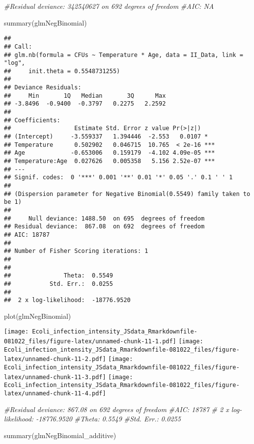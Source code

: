\documentclass[
]{article}
\newenvironment{Shaded}{\begin{snugshade}}{\end{snugshade}}
\newcommand{\CommentTok}[1]{\textcolor[rgb]{0.56,0.35,0.01}{\textit{#1}}}
\newcommand{\FunctionTok}[1]{\textcolor[rgb]{0.00,0.00,0.00}{#1}}
\newcommand{\NormalTok}[1]{#1}
\begin{document}
\begin{Shaded}
\begin{Highlighting}[]
\CommentTok{\#Residual deviance: 342540627  on 692  degrees of freedom}
\CommentTok{\#AIC: NA}

\FunctionTok{summary}\NormalTok{(glmNegBinomial)}
\end{Highlighting}
\end{Shaded}

\begin{verbatim}
## 
## Call:
## glm.nb(formula = CFUs ~ Temperature * Age, data = II_Data, link = "log", 
##     init.theta = 0.5548731255)
## 
## Deviance Residuals: 
##     Min       1Q   Median       3Q      Max  
## -3.8496  -0.9400  -0.3797   0.2275   2.2592  
## 
## Coefficients:
##                  Estimate Std. Error z value Pr(>|z|)    
## (Intercept)     -3.559337   1.394446  -2.553   0.0107 *  
## Temperature      0.502902   0.046715  10.765  < 2e-16 ***
## Age             -0.653006   0.159179  -4.102 4.09e-05 ***
## Temperature:Age  0.027626   0.005358   5.156 2.52e-07 ***
## ---
## Signif. codes:  0 '***' 0.001 '**' 0.01 '*' 0.05 '.' 0.1 ' ' 1
## 
## (Dispersion parameter for Negative Binomial(0.5549) family taken to be 1)
## 
##     Null deviance: 1488.50  on 695  degrees of freedom
## Residual deviance:  867.08  on 692  degrees of freedom
## AIC: 18787
## 
## Number of Fisher Scoring iterations: 1
## 
## 
##               Theta:  0.5549 
##           Std. Err.:  0.0255 
## 
##  2 x log-likelihood:  -18776.9520
\end{verbatim}

\begin{Shaded}
\begin{Highlighting}[]
\FunctionTok{plot}\NormalTok{(glmNegBinomial)}
\end{Highlighting}
\end{Shaded}

\texttt{[image: Ecoli\_infection\_intensity\_JSdata\_Rmarkdownfile-081022\_files/figure-latex/unnamed-chunk-11-1.pdf]}
\texttt{[image: Ecoli\_infection\_intensity\_JSdata\_Rmarkdownfile-081022\_files/figure-latex/unnamed-chunk-11-2.pdf]}
\texttt{[image: Ecoli\_infection\_intensity\_JSdata\_Rmarkdownfile-081022\_files/figure-latex/unnamed-chunk-11-3.pdf]}
\texttt{[image: Ecoli\_infection\_intensity\_JSdata\_Rmarkdownfile-081022\_files/figure-latex/unnamed-chunk-11-4.pdf]}

\begin{Shaded}
\begin{Highlighting}[]
\CommentTok{\#Residual deviance:  867.08  on 692  degrees of freedom}
\CommentTok{\#AIC: 18787}
\CommentTok{\# 2 x log{-}likelihood:  {-}18776.9520  }
\CommentTok{\#Theta:  0.5549 }
\CommentTok{\#Std. Err.:  0.0255}


\FunctionTok{summary}\NormalTok{(glmNegBinomial\_additive)}
\end{Highlighting}
\end{Shaded}
\end{document}
